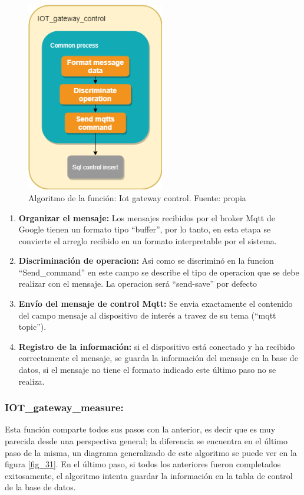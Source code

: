 \begin{figure}[htbp]
	\centerline{\includegraphics[width=6cm]{figuras/algoritmo_iot_control.png}}
	\caption{Algoritmo de la función: Iot gateway control. Fuente: propia}
	\label{fig_30}
\end{figure}
\begin{enumerate}
	\item \textbf{Organizar el mensaje:} Los mensajes recibidos por el broker Mqtt de Google tienen un formato tipo ``buffer'', por lo tanto, en esta etapa se convierte el arreglo recibido en un formato interpretable por el sistema.
	\item \textbf{Discriminación de operacion:} Asi como se discriminó en la funcion ``Send\_command'' en este campo se describe el tipo de operacion que se debe realizar con el mensaje. La operacion será ``send-save'' por defecto
	\item \textbf{Envío del mensaje de control Mqtt:} Se envia exactamente el contenido del campo mensaje al dispositivo de interés a travez de su tema (``mqtt topic'').
	\item \textbf{Registro de la información:} si el dispositivo está conectado y ha recibido correctamente el mensaje, se guarda la información del mensaje en la base de datos, si el mensaje no tiene el formato indicado este último paso no se realiza.
\end{enumerate}

\subsubsection{IOT\_gateway\_measure:}

Esta función comparte todos sus pasos con la anterior, es decir que es muy parecida desde una perspectiva general; la diferencia se encuentra en el último paso de la misma, un diagrama generalizado de este algoritmo se puede ver en la figura \ref{fig_31}. En el último paso, si todos los anteriores fueron completados exitosamente, el algoritmo intenta guardar la información en la tabla de control de la base de datos.

